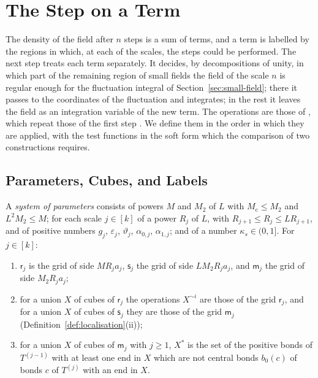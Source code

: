 \documentclass[11pt]{preprint}
\numberwithin{equation}{section}
\begin{document}
\section{The Step on a Term}\label{sec:step}

The density of the field after $n$ steps is a sum of terms, and a term is labelled by the regions in which, at each of the scales, the steps could be performed. The next step treats each term separately. It decides, by decompositions of unity, in which part of the remaining region of small fields the field of the scale $n$ is regular enough for the fluctuation integral of Section~\ref{sec:small-field}; there it passes to the coordinates of the fluctuation and integrates; in the rest it leaves the field as an integration variable of the new term. The operations are those of \cite[Sect.~3]{BalabanCRE}, which repeat those of the first step \cite[Sect.~1]{BalabanCRE}. We define them in the order in which they are applied, with the test functions in the soft form which the comparison of two constructions requires.

\subsection{Parameters, Cubes, and Labels}\label{sec:labels}

\begin{definition}\label{def:parameters}
A \emph{system of parameters} consists of powers $M$ and $M_2$ of $L$ with $M_{\mathrm c} \leqslant M_2$ and $L^2M_2 \leqslant M$; for each scale $j \in [k]$ of a power $R_j$ of $L$, with $R_{j+1} \leqslant R_j \leqslant LR_{j+1}$, and of positive numbers $g_j$, $\varepsilon_j$, $\vartheta_j$, $\alpha_{0,j}$, $\alpha_{1,j}$; and of a number $\kappa_s \in (0, 1]$. For $j \in [k]$:
\begin{enumerate}[label=(\roman*)]
\item $\mathsf r_j$ is the grid of side $MR_ja_j$, $\mathsf s_j$ the grid of side $LM_2R_ja_j$, and $\mathsf m_j$ the grid of side $M_2R_ja_j$;
\item for a union $X$ of cubes of $\mathsf r_j$ the operations $X^{\sim i}$ are those of the grid $\mathsf r_j$, and for a union $X$ of cubes of $\mathsf s_j$ they are those of the grid $\mathsf m_j$ (Definition~\ref{def:localisation}(ii));
\item for a union $X$ of cubes of $\mathsf m_j$ with $j \geqslant 1$, $X^*$ is the set of the positive bonds of $T^{(j-1)}$ with at least one end in $X$ which are not central bonds $b_0(c)$ of bonds $c$ of $T^{(j)}$ with an end in $X$.
\end{enumerate}
\end{definition}
\end{document}

